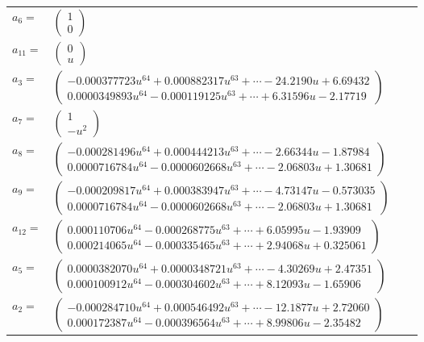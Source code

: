 \documentclass[1p]{elsarticle_modified}
\theoremstyle{definition}
\begin{document}
\begin{tabular}{m{7pt} m{180pt} m{7pt} m{180pt} }
\flushright $a_{6}=$&$\begin{pmatrix}1\\0\end{pmatrix}$ \\
\flushright $a_{11}=$&$\begin{pmatrix}0\\u\end{pmatrix}$ \\
\flushright $a_{3}=$&$\begin{pmatrix}-0.000377723 u^{64}+0.000882317 u^{63}+\cdots-24.2190 u+6.69432\\0.0000349893 u^{64}-0.000119125 u^{63}+\cdots+6.31596 u-2.17719\end{pmatrix}$ \\
\flushright $a_{7}=$&$\begin{pmatrix}1\\- u^2\end{pmatrix}$ \\
\flushright $a_{8}=$&$\begin{pmatrix}-0.000281496 u^{64}+0.000444213 u^{63}+\cdots-2.66344 u-1.87984\\0.0000716784 u^{64}-0.0000602668 u^{63}+\cdots-2.06803 u+1.30681\end{pmatrix}$ \\
\flushright $a_{9}=$&$\begin{pmatrix}-0.000209817 u^{64}+0.000383947 u^{63}+\cdots-4.73147 u-0.573035\\0.0000716784 u^{64}-0.0000602668 u^{63}+\cdots-2.06803 u+1.30681\end{pmatrix}$ \\
\flushright $a_{12}=$&$\begin{pmatrix}0.000110706 u^{64}-0.000268775 u^{63}+\cdots+6.05995 u-1.93909\\0.000214065 u^{64}-0.000335465 u^{63}+\cdots+2.94068 u+0.325061\end{pmatrix}$ \\
\flushright $a_{5}=$&$\begin{pmatrix}0.0000382070 u^{64}+0.0000348721 u^{63}+\cdots-4.30269 u+2.47351\\0.000100912 u^{64}-0.000304602 u^{63}+\cdots+8.12093 u-1.65906\end{pmatrix}$ \\
\flushright $a_{2}=$&$\begin{pmatrix}-0.000284710 u^{64}+0.000546492 u^{63}+\cdots-12.1877 u+2.72060\\0.000172387 u^{64}-0.000396564 u^{63}+\cdots+8.99806 u-2.35482\end{pmatrix}$ \\

\end{tabular}
\end{document}
